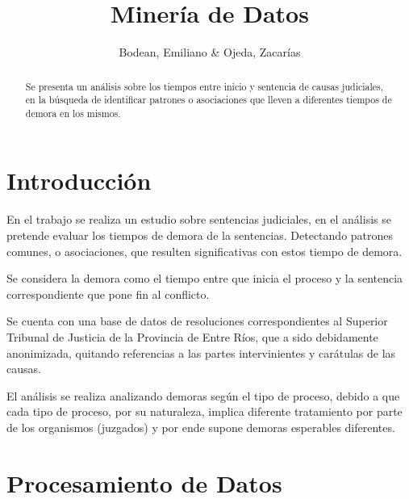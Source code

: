 \documentclass[runningheads,a4paper]{llncs}
\begin{document}
\title{Minería de Datos}


\author{Bodean, Emiliano \& Ojeda, Zacarías}




%
\iffalse
\authorinfo{
  
}{
}{
  \{\}
}
\fi


\maketitle


	\begin{abstract}
		Se presenta un análisis sobre los tiempos entre inicio y sentencia de
causas judiciales, en la búsqueda de identificar patrones o asociaciones
que lleven a diferentes tiempos de demora en los mismos.
	\end{abstract}


\section{Introducción}\label{introduccion}

En el trabajo se realiza un estudio sobre sentencias judiciales, en el
análisis se pretende evaluar los tiempos de demora de la sentencias.
Detectando patrones comunes, o asociaciones, que resulten significativas
con estos tiempo de demora.

Se considera la demora como el tiempo entre que inicia el proceso y la
sentencia correspondiente que pone fin al conflicto.

Se cuenta con una base de datos de resoluciones correspondientes al
Superior Tribunal de Justicia de la Provincia de Entre Ríos, que a sido
debidamente anonimizada, quitando referencias a las partes
intervinientes y carátulas de las causas.

El análisis se realiza analizando demoras según el tipo de proceso,
debido a que cada tipo de proceso, por su naturaleza, implica diferente
tratamiento por parte de los organismos (juzgados) y por ende supone
demoras esperables diferentes.

\section{Procesamiento de Datos}\label{procesamiento-de-datos}
\end{document}
